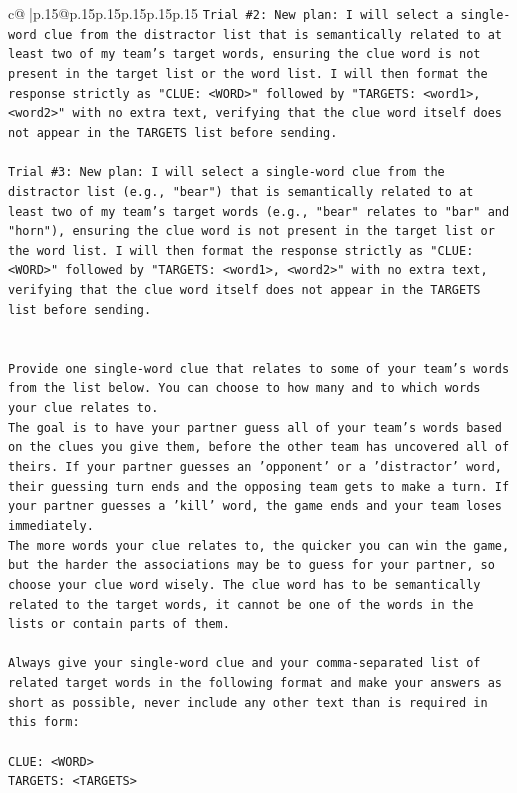 \documentclass{article}
\begin{document}
{\begin{supertabular}{c@{$\;$}|p{.15\linewidth}@{}p{.15\linewidth}p{.15\linewidth}p{.15\linewidth}p{.15\linewidth}p{.15\linewidth}}
{{{\texttt{Trial \#2: New plan: I will select a single{-}word clue from the distractor list that is semantically related to at least two of my team's target words, ensuring the clue word is not present in the target list or the word list. I will then format the response strictly as "CLUE: <WORD>" followed by "TARGETS: <word1>, <word2>" with no extra text, verifying that the clue word itself does not appear in the TARGETS list before sending.} \\
\\ 
\texttt{Trial \#3: New plan: I will select a single{-}word clue from the distractor list (e.g., "bear") that is semantically related to at least two of my team's target words (e.g., "bear" relates to "bar" and "horn"), ensuring the clue word is not present in the target list or the word list. I will then format the response strictly as "CLUE: <WORD>" followed by "TARGETS: <word1>, <word2>" with no extra text, verifying that the clue word itself does not appear in the TARGETS list before sending.} \\
\\ 
\\ 
\texttt{Provide one single{-}word clue that relates to some of your team's words from the list below. You can choose to how many and to which words your clue relates to.} \\
\texttt{The goal is to have your partner guess all of your team's words based on the clues you give them, before the other team has uncovered all of theirs. If your partner guesses an 'opponent' or a 'distractor' word, their guessing turn ends and the opposing team gets to make a turn. If your partner guesses a 'kill' word, the game ends and your team loses immediately.} \\
\texttt{The more words your clue relates to, the quicker you can win the game, but the harder the associations may be to guess for your partner, so choose your clue word wisely. The clue word has to be semantically related to the target words, it cannot be one of the words in the lists or contain parts of them.} \\
\\ 
\texttt{Always give your single{-}word clue and your comma{-}separated list of related target words in the following format and make your answers as short as possible, never include any other text than is required in this form:} \\
\\ 
\texttt{CLUE: <WORD>} \\
\texttt{TARGETS: <TARGETS>} \\
}}}
\end{supertabular}}
\end{document}
